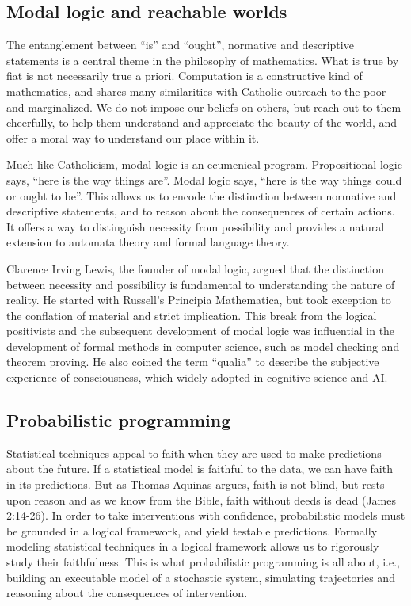 \documentclass[sigplan,nonacm]{acmart}\settopmatter{printfolios=false,printccs=false,printacmref=false}
\begin{document}
  \subsection{Modal logic and reachable worlds}

  The entanglement between ``is'' and ``ought'', normative and descriptive statements is a central theme in the philosophy of mathematics. What is true by fiat is not necessarily true a priori. Computation is a constructive kind of mathematics, and shares many similarities with Catholic outreach to the poor and marginalized. We do not impose our beliefs on others, but reach out to them cheerfully, to help them understand and appreciate the beauty of the world, and offer a moral way to understand our place within it.

  Much like Catholicism, modal logic is an ecumenical program. Propositional logic says, ``here is the way things are''. Modal logic says, ``here is the way things could or ought to be''. This allows us to encode the distinction between normative and descriptive statements, and to reason about the consequences of certain actions. It offers a way to distinguish necessity from possibility and provides a natural extension to automata theory and formal language theory.

  Clarence Irving Lewis, the founder of modal logic, argued that the distinction between necessity and possibility is fundamental to understanding the nature of reality. He started with Russell's Principia Mathematica, but took exception to the conflation of material and strict implication. This break from the logical positivists and the subsequent development of modal logic was influential in the development of formal methods in computer science, such as model checking and theorem proving. He also coined the term ``qualia'' to describe the subjective experience of consciousness, which widely adopted in cognitive science and AI.

  \subsection{Probabilistic programming}

  Statistical techniques appeal to faith when they are used to make predictions about the future. If a statistical model is faithful to the data, we can have faith in its predictions. But as Thomas Aquinas argues, faith is not blind, but rests upon reason and as we know from the Bible, faith without deeds is dead (James 2:14-26). In order to take interventions with confidence, probabilistic models must be grounded in a logical framework, and yield testable predictions. Formally modeling statistical techniques in a logical framework allows us to rigorously study their faithfulness. This is what probabilistic programming is all about, i.e., building an executable model of a stochastic system, simulating trajectories and reasoning about the consequences of intervention.
\end{document}
